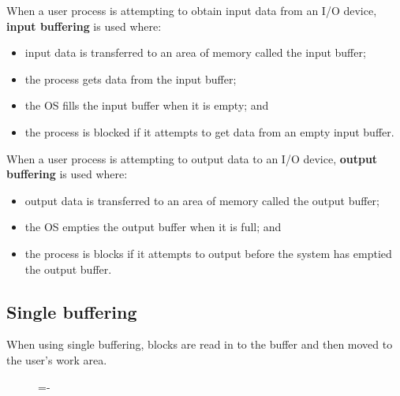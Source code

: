 \documentclass[a4paper]{systems-software}
\begin{document}
When a user process is attempting to obtain input data from an I/O device, \textbf{input buffering} is used where:
\begin{itemize}
	\item input data is transferred to an area of memory called the input buffer;
	\item the process gets data from the input buffer;
	\item the OS fills the input buffer when it is empty; and
	\item the process is blocked if it attempts to get data from an empty input buffer.
\end{itemize}

When a user process is attempting to output data to an I/O device, \textbf{output buffering} is used where:
\begin{itemize}
	\item output data is transferred to an area of memory called the output buffer;
	\item the OS empties the output buffer when it is full; and
	\item the process is blocks if it attempts to output before the system has emptied the output buffer.
\end{itemize}


\newpage

\subsection*{Single buffering}

When using single buffering, blocks are read in to the buffer and then moved to the user's work area.

\begin{figure}[H]
  \lineskip=-\fboxrule
\end{figure}
\end{document}
